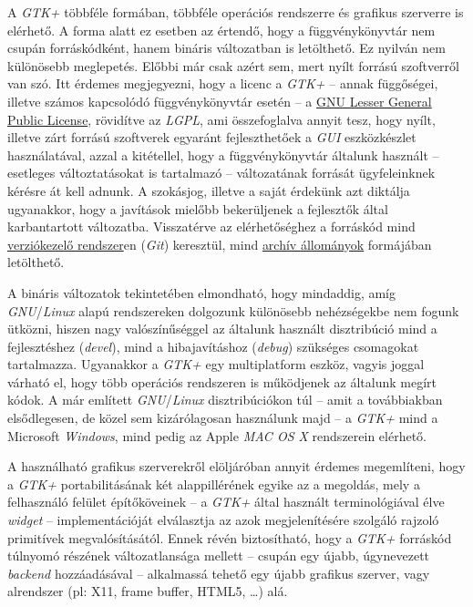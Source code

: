 A \textit{GTK+} többféle formában, többféle operációs rendszerre és grafikus szerverre is elérhető. A forma alatt ez esetben az értendő, hogy a függvénykönyvtár nem csupán forráskódként, hanem bináris  változatban is letölthető. Ez nyilván nem különösebb meglepetés. Előbbi már csak azért sem, mert nyílt forrású szoftverről van szó. Itt érdemes megjegyezni, hogy a licenc a \textit{GTK+} -- annak függőségei, illetve számos kapcsolódó függvénykönyvtár esetén -- a \href{http://www.gnu.org/licenses/lgpl-2.1.html}{GNU Lesser General Public License}, rövidítve az \textit{LGPL}, ami összefoglalva annyit tesz, hogy nyílt, illetve zárt forrású szoftverek egyaránt fejleszthetőek a \textit{GUI} eszközkészlet használatával, azzal a kitétellel, hogy a függvénykönyvtár általunk használt -- esetleges változtatásokat is tartalmazó -- változatának forrását ügyfeleinknek kérésre át kell adnunk. A szokásjog, illetve a saját érdekünk azt diktálja ugyanakkor, hogy a javítások mielőbb bekerüljenek a fejlesztők által karbantartott változatba. Visszatérve az elérhetőséghez a forráskód mind \href{http://git.gnome.org/browse/gtk+/}{verziókezelő rendszer}en (\textit{Git}) keresztül, mind \href{ftp://ftp.gtk.org/pub/gtk/}{archív állományok} formájában letölthető.

A bináris változatok tekintetében elmondható, hogy mindaddig, amíg \textit{GNU}/\textit{Linux} alapú rendszereken dolgozunk különösebb nehézségekbe nem fogunk ütközni, hiszen nagy valószínűséggel az általunk használt disztribúció mind a fejlesztéshez (\textit{devel}), mind a hibajavításhoz (\textit{debug}) szükséges csomagokat tartalmazza. Ugyanakkor a \textit{GTK+} egy multiplatform eszköz, vagyis joggal várható el, hogy több operációs rendszeren is működjenek az általunk megírt kódok. A már említett \textit{GNU}/\textit{Linux} disztribúciókon túl -- amit a továbbiakban elsődlegesen, de közel sem kizárólagosan használunk majd -- a \textit{GTK+} mind a Microsoft \textit{Windows}, mind pedig az Apple \textit{MAC OS X} rendszerein elérhető.

A használható grafikus szerverekről elöljáróban annyit érdemes megemlíteni, hogy a \textit{GTK+} portabilitásának két alappillérének egyike az a megoldás, mely a felhasználó felület építőköveinek -- a \textit{GTK+} által használt terminológiával élve \textit{widget} -- implementációját elválasztja az azok megjelenítésére szolgáló rajzoló primitívek megvalósításától. Ennek révén biztosítható, hogy a \textit{GTK+} forráskód túlnyomó részének változatlansága mellett -- csupán egy újabb, úgynevezett \textit{backend} hozzáadásával -- alkalmassá tehető egy újabb grafikus szerver, vagy alrendszer (pl: X11, frame buffer, HTML5, \dots) alá.

